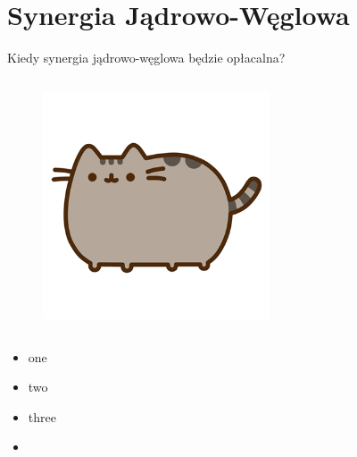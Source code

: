 \section{Synergia Jądrowo-Węglowa}

\begin{columnframe}{Kiedy synergia jądrowo-węglowa będzie opłacalna?}
    \begin{column}{0.5\textwidth}
        \begin{figure}
            \centering
            \includegraphics[width=0.6\textwidth, frame]{images/pusheen.png}
        \end{figure}
    \end{column}
    \begin{column}{0.5\textwidth}
        \begin{itemize}
            \item one \keV
            \item two \MeV
            \item three \GeV
            \item \aegis
        \end{itemize}
    \end{column}
\end{columnframe}

